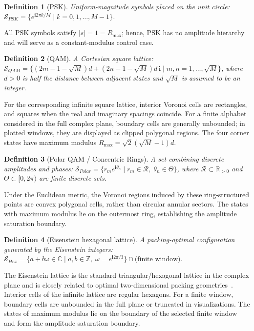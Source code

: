 \documentclass[10pt,journal,letterpaper]{IEEEtran}
\newtheorem{definition}{Definition}
\begin{document}
\begin{definition}[PSK]
Uniform-magnitude symbols placed on the unit circle:
$\mathcal{S}_{PSK} = \bigl\{ e^{\mathbf{i} 2\pi k / M} \mid 
   k = 0, 1, \dots, M-1 \bigr\}$.
\end{definition}

All PSK symbols satisfy $|s|=1=R_{\max}$; hence, PSK has no amplitude hierarchy
and will serve as a constant-modulus control case.

\begin{definition}[QAM]
A Cartesian square lattice:
$\mathcal{S}_{QAM} = \bigl\{ (2m - 1 - \sqrt{M})d + 
   (2n - 1 - \sqrt{M})d\,\mathbf{i} \mid m,n = 1,\dots,\sqrt{M} \bigr\}$,
where $d>0$ is half the distance between adjacent states and $\sqrt{M}$ is assumed
to be an integer.
\end{definition}

For the corresponding infinite square lattice, interior Voronoi cells are
rectangles, and squares when the real and imaginary spacings coincide. For a
finite alphabet considered in the full complex plane, boundary cells are
generally unbounded; in plotted windows, they are displayed as clipped polygonal
regions. The four corner states have maximum modulus
$R_{\max}=\sqrt{2}(\sqrt{M}-1)d$.

\begin{definition}[Polar QAM / Concentric Rings]
A set combining discrete amplitudes and phases:
$\mathcal{S}_{Polar} = \bigl\{ r_m e^{\mathbf{i} \theta_n} \mid 
   r_m \in \mathcal{R},\; \theta_n \in \Theta \bigr\}$,
where $\mathcal{R} \subset \mathbb{R}_{>0}$ and $\Theta \subset [0,2\pi)$ are 
finite discrete sets.
\end{definition}

Under the Euclidean metric, the Voronoi regions induced by these ring-structured
points are convex polygonal cells, rather than circular annular sectors. The
states with maximum modulus lie on the outermost ring, establishing the
amplitude saturation boundary.

\begin{definition}[Eisenstein hexagonal lattice]
A packing-optimal configuration generated by the Eisenstein integers:
$\mathcal{S}_{Hex} = \bigl\{ a + b\omega \in \mathbb{C} \mid a,b \in \mathbb{Z},\;
   \omega = e^{\mathbf{i}2\pi/3} \bigr\} \cap \text{(finite window)}$.
\end{definition}

The Eisenstein lattice is the standard triangular/hexagonal lattice in the
complex plane and is closely related to optimal two-dimensional packing
geometries~\cite{conwaySloane1999}. Interior cells of the infinite lattice are
regular hexagons. For a finite window, boundary cells are unbounded in the full
plane or truncated in visualizations. The states of maximum modulus lie on the
boundary of the selected finite window and form the amplitude saturation
boundary.
\end{document}
